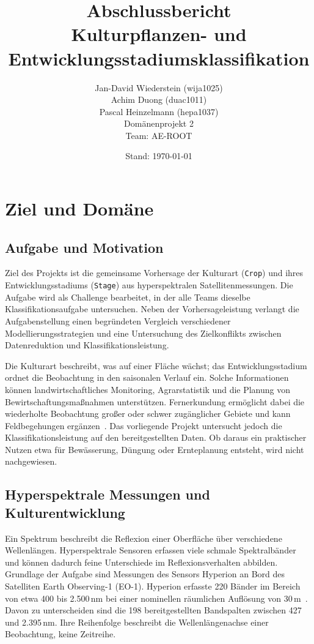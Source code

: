 \documentclass[11pt,a4paper,titlepage]{article}
\title{Abschlussbericht\\Kulturpflanzen- und Entwicklungsstadiumsklassifikation}
\author{Jan-David Wiederstein (wija1025)\\
	Achim Duong (duac1011)\\
	Pascal Heinzelmann (hepa1037)\\[1ex]
	Dom\"anenprojekt 2\\Team: AE-ROOT}
\date{Stand: \today}
\begin{document}
\hypersetup{pageanchor=false}
\maketitle
\hypersetup{pageanchor=true}

\setcounter{tocdepth}{2}
\tableofcontents
\clearpage
{}

\section{Ziel und Dom\"ane}

\subsection{Aufgabe und Motivation}

Ziel des Projekts ist die gemeinsame Vorhersage der Kulturart (\texttt{Crop}) und ihres
Entwicklungsstadiums (\texttt{Stage}) aus hyperspektralen Satellitenmessungen.
Die Aufgabe wird als Challenge bearbeitet, in der alle Teams dieselbe
Klassifikationsaufgabe untersuchen. Neben der Vorhersageleistung verlangt die
Aufgabenstellung einen begr\"undeten Vergleich verschiedener Modellierungsstrategien
und eine Untersuchung des Zielkonflikts zwischen Datenreduktion und
Klassifikationsleistung.

Die Kulturart beschreibt, was auf einer Fl\"ache w\"achst; das Entwicklungsstadium
ordnet die Beobachtung in den saisonalen Verlauf ein. Solche Informationen k\"onnen
landwirtschaftliches Monitoring, Agrarstatistik und die Planung von
Bewirtschaftungsma\ss nahmen unterst\"utzen. Fernerkundung erm\"oglicht dabei die
wiederholte Beobachtung gro\ss er oder schwer zug\"anglicher Gebiete und kann
Feldbegehungen erg\"anzen~\cite{mulla2013}. Das vorliegende Projekt untersucht
jedoch die Klassifikationsleistung auf den bereitgestellten Daten. Ob daraus
ein praktischer Nutzen etwa f\"ur Bew\"asserung, D\"ungung oder Ernteplanung
entsteht, wird nicht nachgewiesen.

\subsection{Hyperspektrale Messungen und Kulturentwicklung}

Ein Spektrum beschreibt die Reflexion einer Oberfl\"ache \"uber verschiedene
Wellenl\"angen. Hyperspektrale Sensoren erfassen viele schmale Spektralb\"ander
und k\"onnen dadurch feine Unterschiede im Reflexionsverhalten abbilden.
Grundlage der Aufgabe sind Messungen des Sensors Hyperion an Bord des
Satelliten Earth Observing-1 (EO-1). Hyperion erfasste 220 B\"ander im Bereich
von etwa 400 bis 2.500\,nm bei einer nominellen r\"aumlichen Aufl\"osung von
30\,m~\cite{nasa2025}. Davon zu unterscheiden sind die 198 bereitgestellten
Bandspalten zwischen 427 und 2.395\,nm. Ihre Reihenfolge beschreibt die
Wellenl\"angenachse einer Beobachtung, keine Zeitreihe.
\end{document}
